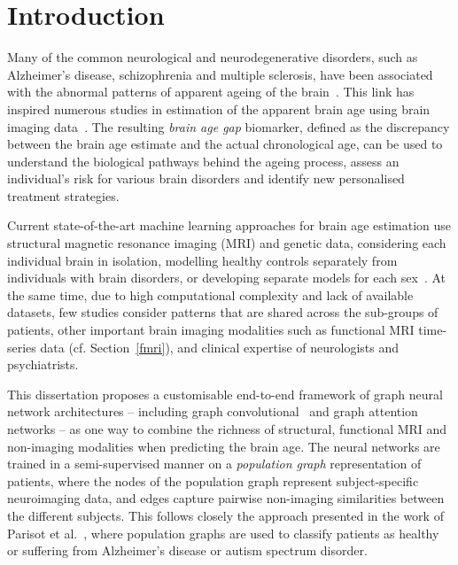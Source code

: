 \chapter{Introduction}



Many of the common neurological and neurodegenerative disorders, such as Alzheimer’s disease, schizophrenia and multiple sclerosis, have been associated with the abnormal patterns of apparent ageing of the brain~\cite{kaufmann2019}. This link has inspired numerous studies in estimation of the apparent brain age using brain imaging data~\cite{franke2019ten}. The resulting \textit{brain age gap} biomarker, defined as the discrepancy between the brain age estimate and the actual chronological age, can be used to understand the biological pathways behind the ageing process, assess an individual’s risk for various brain disorders and identify new personalised treatment strategies.

Current state-of-the-art machine learning approaches for brain age estimation use structural magnetic resonance imaging (MRI) and genetic data, considering each individual brain in isolation, modelling healthy controls separately from individuals with brain disorders, or developing separate models for each sex~\cite{kaufmann2019,niu2019improved}. At the same time, due to high computational complexity and lack of available datasets, few studies consider patterns that are shared across the sub-groups of patients, other important brain imaging modalities such as functional MRI time-series data (cf. Section~\ref{fmri}), and clinical expertise of neurologists and psychiatrists.

This dissertation proposes a customisable end-to-end framework of graph neural network architectures – including graph convolutional~\cite{kipf2017semi} and graph attention~\cite{velickovic2018graph} networks – as one way to combine the richness of structural, functional MRI and non-imaging modalities when predicting the brain age. The neural networks are trained in a semi-supervised manner on a \textit{population graph} representation of patients, where the nodes of the population graph represent subject-specific neuroimaging data, and edges capture pairwise non-imaging similarities between the different subjects. This follows closely the approach presented in the work of Parisot et al.~\cite{parisot2017spectral,parisot2018disease}, where population graphs are used to classify patients as healthy or suffering from Alzheimer's disease or autism spectrum disorder.

